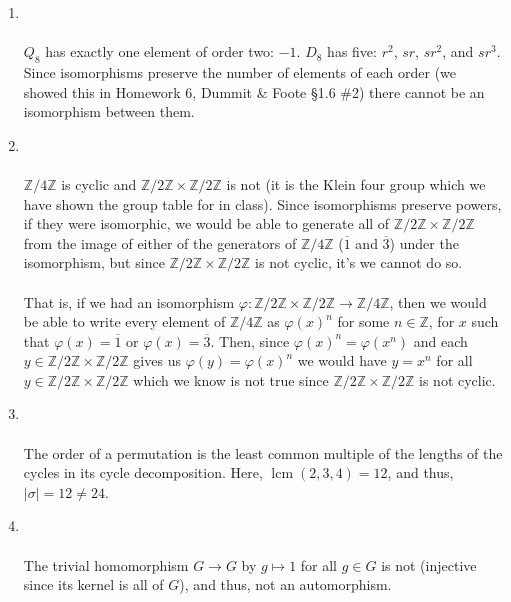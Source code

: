 \documentclass[12 pt, letterpaper]{hmcpset}
\begin{document}
\begin{solution}
	\begin{enumerate}
		\item {} \\\\
			$Q_{8}$ has exactly one element of order two: $-1$. $D_{8}$ has five: $r^{2}$, $sr$, $sr^{2}$, and $sr^{3}$. Since isomorphisms preserve the number of elements of each order (we showed this in Homework 6, Dummit \& Foote \S1.6 \#2) there cannot be an isomorphism between them.
		\item {} \\\\
			$\mathbb{Z}/4\mathbb{Z}$ is cyclic and $\mathbb{Z}/2\mathbb{Z} \times \mathbb{Z}/2\mathbb{Z}$ is not (it is the Klein four group which we have shown the group table for in class). Since isomorphisms preserve powers, if they were isomorphic, we would be able to generate all of $\mathbb{Z}/2\mathbb{Z} \times \mathbb{Z}/2\mathbb{Z}$ from the image of either of the generators of $\mathbb{Z}/4\mathbb{Z}$ ($\overline{1}$ and $\overline{3}$) under the isomorphism, but since $\mathbb{Z}/2\mathbb{Z} \times \mathbb{Z}/2\mathbb{Z}$ is not cyclic, it's we cannot do so. \\\\
			That is, if we had an isomorphism $\varphi : \mathbb{Z} / 2 \mathbb{Z} \times \mathbb{Z} / 2 \mathbb{Z} \to \mathbb{Z} / 4 \mathbb{Z}$, then we would be able to write every element of $\mathbb{Z} / 4 \mathbb{Z}$ as $\varphi(x)^{n}$ for some $n \in \mathbb{Z}$, for $x$ such that $\varphi(x) = \overline{1}$ or $\varphi(x) = \overline{3}$. Then, since $\varphi(x)^{n} = \varphi(x^{n})$ and each $y \in \mathbb{Z} / 2 \mathbb{Z} \times \mathbb{Z} / 2 \mathbb{Z}$ gives us $\varphi(y) = \varphi(x)^{n}$ we would have $y = x^{n}$ for all $y \in \mathbb{Z} / 2 \mathbb{Z} \times \mathbb{Z} / 2 \mathbb{Z}$ which we know is not true since $\mathbb{Z} / 2 \mathbb{Z} \times \mathbb{Z} / 2 \mathbb{Z}$ is not cyclic.
		\item {} \\\\
			The order of a permutation is the least common multiple of the lengths of the cycles in its cycle decomposition. Here, $\operatorname{lcm} (2, 3, 4) = 12$, and thus, $\vert \sigma \vert = 12 \neq 24$.
		\item {} \\\\
			The trivial homomorphism $G \to G$ by $g \mapsto 1$ for all $g \in G$ is not (injective since its kernel is all of $G$), and thus, not an automorphism.

\end{enumerate}
\end{solution}
\end{document}
